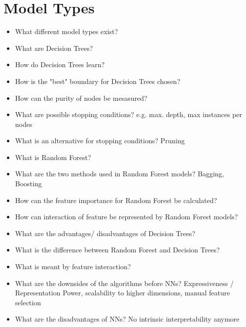 \documentclass{report}
\begin{document}
	\section{Model Types}
	
	\begin{itemize}
		\item What different model types exist?
		\newline 
		
		\item What are Decision Trees?
		\newline 
		\item How do Decision Trees learn?
		\newline 
		\item How is the "best" boundary for Decision Trees chosen?
		\newline 
		\item How can the purity of nodes be mesasured?
		\newline 
		\item What are possible stopping conditions?
		\newline e.g. max. depth, max instances per nodes
		\item What is an alternative for stopping conditions?
		\newline Pruning
		\item What is Random Forest?
		\newline 
		\item What are the two methods used in Random Forest models?
		\newline Bagging, Boosting
		\item How can the feature importance for Random Forest be calculated?
		\newline 
		\item How can interaction of feature be represented by Random Forest models?
		\newline 
		\item What are the advantages/ disadvantages of Decision Trees?
		\newline 
		\item What is the difference between Random Forest and Decision Trees?
		\newline 
		\item What is meant by feature interaction?
		\newline 
		
		\item What are the downsides of the algorithms before NNs?
		\newline Expressiveness / Representation Power, scalability to higher dimensions, manual feature selection
		\item What are the disadvantages of NNs?
		\newline No intrinsic interpretability anymore
		

\end{itemize}
\end{document}

